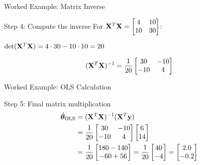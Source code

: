 \documentclass{beamer}
\begin{document}
\begin{frame}{Worked Example: Matrix Inverse}
\begin{codebox}{Step 4: Compute the inverse}
For $\mathbf{X}^T\mathbf{X} = \begin{bmatrix} 4 & 10 \\ 10 & 30 \end{bmatrix}$:

$\operatorname{det}(\mathbf{X}^T\mathbf{X}) = 4 \cdot 30 - 10 \cdot 10 = 20$

$$(\mathbf{X}^{T}\mathbf{X})^{-1} = \frac{1}{20} \begin{bmatrix} 30 & -10 \\ -10 & 4 \end{bmatrix}$$
\end{codebox}
\end{frame}

\begin{frame}{Worked Example: OLS Calculation}
\begin{codebox}{Step 5: Final matrix multiplication}
\begin{align*}
\hat{\boldsymbol{\theta}}_{\text{OLS}} &= (\mathbf{X}^{T}\mathbf{X})^{-1}(\mathbf{X}^{T}\mathbf{y}) \\
&= \frac{1}{20} \begin{bmatrix} 30 & -10 \\ -10 & 4 \end{bmatrix} \begin{bmatrix} 6 \\ 14 \end{bmatrix} \\
&= \frac{1}{20} \begin{bmatrix} 180-140 \\ -60+56 \end{bmatrix} = \frac{1}{20} \begin{bmatrix} 40 \\ -4 \end{bmatrix} = \begin{bmatrix} 2.0 \\ -0.2 \end{bmatrix}
\end{align*}
\end{codebox}
\end{frame}
\end{document}
